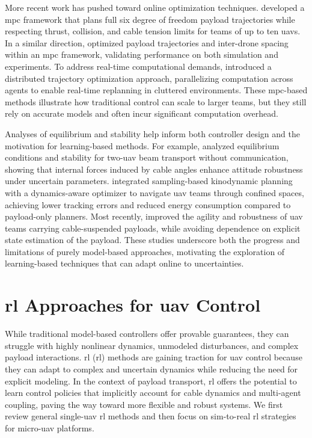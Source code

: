 More recent work has pushed toward online optimization techniques. \cite{sun_nonlinear_2023} developed a \gls{mpc} framework that plans full six degree of freedom payload trajectories while respecting thrust, collision, and cable tension limits for teams of up to ten \glspl{uav}. In a similar direction, \cite{li_nonlinear_2023} optimized payload trajectories and inter-drone spacing within an \gls{mpc} framework, validating performance on both simulation and experiments. To address real-time computational demands, \cite{jackson_scalable_2020} introduced a distributed trajectory optimization approach, parallelizing computation across agents to enable real-time replanning in cluttered environments. These \gls{mpc}-based methods illustrate how traditional control can scale to larger teams, but they still rely on accurate models and often incur significant computation overhead.

Analyses of equilibrium and stability help inform both controller design and the motivation for learning-based methods. For example, \cite{gabellieri_equilibria_2023} analyzed equilibrium conditions and stability for two-\gls{uav} beam transport without communication, showing that internal forces induced by cable angles enhance attitude robustness under uncertain parameters. \cite{wahba_kinodynamic_2024} integrated sampling-based kinodynamic planning with a dynamics-aware optimizer to navigate \gls{uav} teams through confined spaces, achieving lower tracking errors and reduced energy consumption compared to payload-only planners. Most recently, \cite{Wang2025SafeAA} improved the agility and robustness of \gls{uav} teams carrying cable-suspended payloads, while avoiding dependence on explicit state estimation of the payload. These studies underscore both the progress and limitations of purely model-based approaches, motivating the exploration of learning-based techniques that can adapt online to uncertainties.

\section{\gls{rl} Approaches for \gls{uav} Control}
While traditional model-based controllers offer provable guarantees, they can struggle with highly nonlinear dynamics, unmodeled disturbances, and complex payload interactions. \gls{rl} (\gls{rl}) methods are gaining traction for \gls{uav} control because they can adapt to complex and uncertain dynamics while reducing the need for explicit modeling. In the context of payload transport, \gls{rl} offers the potential to learn control policies that implicitly account for cable dynamics and multi-agent coupling, paving the way toward more flexible and robust systems. We first review general single-\gls{uav} \gls{rl} methods and then focus on sim-to-real \gls{rl} strategies for micro-\gls{uav} platforms.

